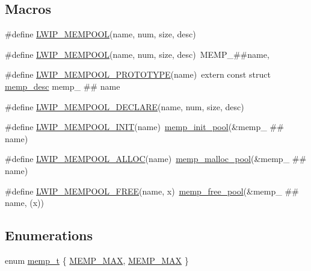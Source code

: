 \subsection*{Macros}
\begin{DoxyCompactItemize}
\item 
\#define \hyperlink{openmote-cc2538_2lwip_2src_2include_2lwip_2memp_8h_a5f75b6e9cf0c6df9e70b08b8e05a1835}{L\+W\+I\+P\+\_\+\+M\+E\+M\+P\+O\+OL}(name,  num,  size,  desc)
\item 
\#define \hyperlink{openmote-cc2538_2lwip_2src_2include_2lwip_2memp_8h_a5f75b6e9cf0c6df9e70b08b8e05a1835}{L\+W\+I\+P\+\_\+\+M\+E\+M\+P\+O\+OL}(name,  num,  size,  desc)~M\+E\+M\+P\+\_\+\#\#name,
\item 
\#define \hyperlink{group__mempool_ga92fc8c29d0e2654f2a2ecc43b2b7fb13}{L\+W\+I\+P\+\_\+\+M\+E\+M\+P\+O\+O\+L\+\_\+\+P\+R\+O\+T\+O\+T\+Y\+PE}(name)~extern const struct \hyperlink{structmemp__desc}{memp\+\_\+desc} memp\+\_\+ \#\# name
\item 
\#define \hyperlink{group__mempool_ga5b1fb3ce7942432d87cc948b1c5ed6cb}{L\+W\+I\+P\+\_\+\+M\+E\+M\+P\+O\+O\+L\+\_\+\+D\+E\+C\+L\+A\+RE}(name,  num,  size,  desc)
\item 
\#define \hyperlink{group__mempool_ga60b51c06d276f525b35d8b7abd4dcb41}{L\+W\+I\+P\+\_\+\+M\+E\+M\+P\+O\+O\+L\+\_\+\+I\+N\+IT}(name)~\hyperlink{openmote-cc2538_2lwip_2src_2include_2lwip_2priv_2memp__priv_8h_a6416303426d05526bed33f241fa6ecd7}{memp\+\_\+init\+\_\+pool}(\&memp\+\_\+ \#\# name)
\item 
\#define \hyperlink{group__mempool_ga5e2498f6c17746c1fe7153de5f7f275a}{L\+W\+I\+P\+\_\+\+M\+E\+M\+P\+O\+O\+L\+\_\+\+A\+L\+L\+OC}(name)~\hyperlink{openmote-cc2538_2lwip_2src_2include_2lwip_2priv_2memp__priv_8h_a348c83ee972f1edf7296a1cdf1d75f22}{memp\+\_\+malloc\+\_\+pool}(\&memp\+\_\+ \#\# name)
\item 
\#define \hyperlink{group__mempool_gaa43d114dd702fbd8f1db18474ea93a04}{L\+W\+I\+P\+\_\+\+M\+E\+M\+P\+O\+O\+L\+\_\+\+F\+R\+EE}(name,  x)~\hyperlink{openmote-cc2538_2lwip_2src_2include_2lwip_2priv_2memp__priv_8h_a62f8c3c907743e34eee3cdac7fa1eaa5}{memp\+\_\+free\+\_\+pool}(\&memp\+\_\+ \#\# name, (x))
\end{DoxyCompactItemize}
\subsection*{Enumerations}
\begin{DoxyCompactItemize}
\item 
enum \hyperlink{openmote-cc2538_2lwip_2src_2include_2lwip_2memp_8h_a85a164b1f7764951cc685ea525114e57}{memp\+\_\+t} \{ \hyperlink{native_2lwip_2src_2include_2lwip_2memp_8h_a85a164b1f7764951cc685ea525114e57a3387042084427642949f3223c7ddd321}{M\+E\+M\+P\+\_\+\+M\+AX}, 
\hyperlink{openmote-cc2538_2lwip_2src_2include_2lwip_2memp_8h_a85a164b1f7764951cc685ea525114e57a3387042084427642949f3223c7ddd321}{M\+E\+M\+P\+\_\+\+M\+AX}
 \}
\end{DoxyCompactItemize}
